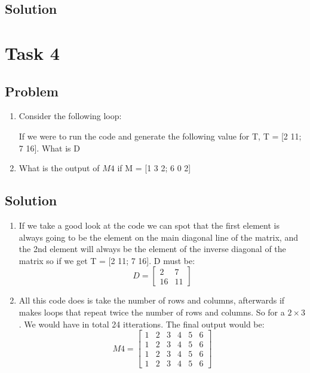 \documentclass[a4paper, 10pt]{article}
\begin{document}
		\subsection{Solution}
	
	\section{Task 4}
	
		\subsection{Problem}
			\begin{enumerate}
				\item
					\noindent Consider the following loop:
					
					
					\noindent If we were to run the code and generate the following value for T, T = [2 11; 7 16]. What is D
				\item 
					What is the output of $M4$ if M = [1 3 2; 6 0 2]
					
			\end{enumerate}
		\subsection{Solution}
			\begin{enumerate}
				\item 
					If we take a good look at the code we can spot that the first element is always going to be the element on the main diagonal line of the matrix, and the 2nd element will always be the element of the inverse diagonal of the matrix so if we get T = [2 11; 7 16]. D must be:
					\[D = \begin{bmatrix}
						2  & 7 \\
						16 & 11
					\end{bmatrix}\]
				\item 
					All this code does is take the number of rows and columns, afterwards if makes loops that repeat twice the number of rows and columns. So for a $2 \times 3$. We would have in total 24 itterations. The final output would be:
					\[M4 = \begin{bmatrix}
						1  & 2 & 3 & 4 & 5 & 6 \\
						1  & 2 & 3 & 4 & 5 & 6 \\
						1  & 2 & 3 & 4 & 5 & 6 \\
						1  & 2 & 3 & 4 & 5 & 6 
					\end{bmatrix}\]
					
			\end{enumerate}
\end{document}
